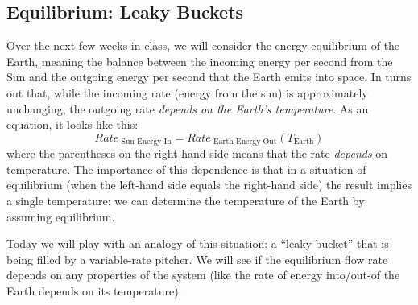 \subsection{Equilibrium: Leaky Buckets}

Over the next few weeks in class, we will consider the energy equilibrium of the Earth, meaning the balance between the incoming energy per second from the Sun and the outgoing energy per second that the Earth emits into space.  In turns out that, while the incoming rate (energy from the sun) is approximately unchanging, the outgoing rate {\em depends on the Earth's temperature}.   As an equation, it looks like this:
	\begin{equation*}
	Rate_\text{  Sun Energy In} = Rate_\text{  Earth Energy Out} \left(T_\text{Earth} \right)
	\end{equation*}
where the parentheses on the right-hand side means that the rate {\em depends} on temperature.  The importance of this dependence is that in a situation of equilibrium (when the left-hand side equals the right-hand side) the result implies a single temperature: we can determine the temperature of the Earth by assuming equilibrium.

Today we will play with an analogy of this situation: a ``leaky bucket'' that is being filled by a variable-rate pitcher.  We will see if the equilibrium flow rate depends on any properties of the system (like the rate of energy into/out-of the Earth depends on its temperature).

\vspace{1cm}

